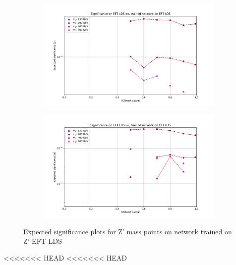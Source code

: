 \documentclass[12pt, a4paper]{book}
\begin{document}
\begin{figure}[!ht]
	\centering
	\begin{subfigure}[b]{0.49\textwidth}
      \centering
      \includegraphics[width=1\textwidth]{XGBoost/EFT_LDS/EXP_SIG_ee.pdf}
      \end{subfigure}
   \hfill
   \begin{subfigure}[b]{0.49\textwidth}
      \centering
      \includegraphics[width=1\textwidth]{XGBoost/EFT_LDS/EXP_SIG_uu.pdf}
      \end{subfigure}
   \caption{Expected significance plots for Z' mass points on network trained on Z' EFT LDS}\label{fig:EFT_LDS_exp_sig}
\end{figure}
<<<<<<< HEAD
<<<<<<< HEAD
\end{document}
